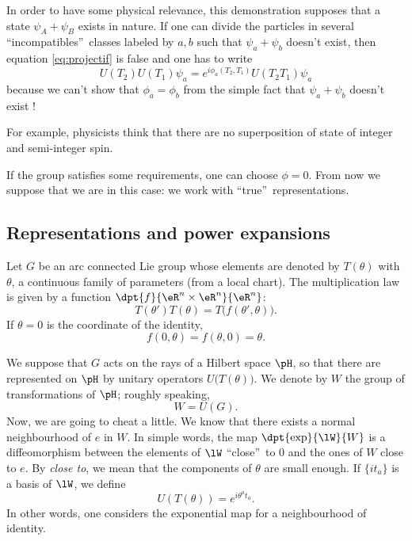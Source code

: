 \begin{remark}
In order to have some physical relevance, this demonstration supposes that a state $\psi_A+\psi_B$ exists in nature. If one can divide the particles in several ``incompatibles''\ classes labeled by $a,b$ such that $\psi_a+\psi_b$ doesn't exist, then equation \eqref{eq:projectif} is false and one has to write 
\[
   U(T_2)U(T_1)\psi_a=e^{i\phi_a(T_2,T_1)}U(T_2T_1)\psi_a
\]
because we can't show that $\phi_a=\phi_b$ from the simple fact that $\psi_a+\psi_b$ doesn't exist !

For example, physicists think that there are no superposition of state of integer and semi-integer spin.
\end{remark}

\begin{remark}
If the group satisfies some requirements, one can choose $\phi=0$. From now we suppose that we are in this case: we work with ``true''\ representations.
\end{remark}


\subsection{Representations and power expansions}

Let $G$ be an arc connected Lie group whose elements are denoted by $T(\theta)$ with $\theta$, a continuous family of parameters (from a local chart). The multiplication law is given by a function $\dpt{f}{\eR^n\times\eR^n}{\eR^n}$:
\begin{equation}\label{eq:T_groupe}
T(\theta')T(\theta)=T\big(f(\theta',\theta)\big).
\end{equation}
If $ \theta=0$ is the coordinate of the identity, 
\begin{equation}\label{eq:f_0}
f(0,\theta)=f(\theta,0)=\theta.
\end{equation}

We suppose that $G$ acts on the rays of a Hilbert space $\pH$, so that there are represented on $\pH$ by unitary operators $U\big(T(\theta)\big)$. We denote by $W$ the group of transformations of $\pH$; roughly speaking, 
\[
     W=U(G).
\]
Now, we are going to cheat a little. We know that there exists a normal neighbourhood of $e$ in $W$. In simple words, the map $\dpt{\exp}{\lW}{W}$ is a diffeomorphism between the elements of $\lW$ ``close''\ to $0$ and the ones of $W$ close to $e$. By \textit{close to}, we mean that the components of $\theta$ are small enough. If $\{it_a\}$ is a basis of $\lW$, we define
\begin{equation}\label{eq:U_expo}
   U(T(\theta))=e^{i\theta^at_a}.
\end{equation}
In other words, one considers the exponential map for a neighbourhood of identity.

